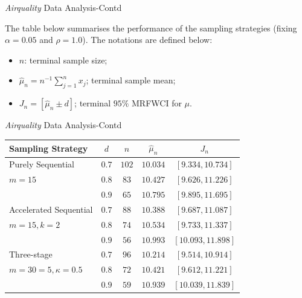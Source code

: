 \documentclass [xcolor=svgnames, t] {beamer}
\begin{document}
\begin{frame}{\textit{Airquality} Data Analysis-Contd}
  \vspace{5mm}

The table below summarises the performance of the sampling strategies (fixing $\alpha=0.05$ and $\rho=1.0$). The notations are defined below:
\begin{itemize}
\item $n$: terminal sample size;
\item $\hat{\mu}_n=n^{-1}\sum_{j=1}^n{x_j}$; terminal sample mean;
\item $J_n=[\hat{\mu}_n \pm d]$; terminal $95\%$ MRFWCI for $\mu$.
\end{itemize}

\end{frame}
\begin{frame}{\textit{Airquality} Data Analysis-Contd}

  \vspace{5mm}
    \begin{center}
\begin{tabular}{l c c c c} 
 \hline
 Sampling Strategy & $d$ & $n$ & $\hat{\mu}_n$ & $J_n$  \\  
 \hline
{Purely Sequential}  & $0.7$ & $102$ & $10.034$ & $[9.334,10.734]$  \\ 
 $m=15$ & $0.8$ & $83$ & $10.427$ & $[9.626,11.226]$ \\
  & $0.9$ & $65$ & $10.795$ & $[9.895,11.695]$\\
 \hline
 {Accelerated Sequential}  & $0.7$ & $88$ & $10.388$ & $[9.687,11.087]$  \\ 
 $m=15, k=2$ & $0.8$ & $74$ & $10.534$ & $[9.733,11.337]$ \\
  & $0.9$ & $56$ & $10.993$ & $[10.093,11.898]$\\
  \hline
{Three-stage }  & $0.7$ & $96$ &$10.214$ & $[9.514,10.914]$  \\ 
 $m=30=5,\kappa=0.5$ & $0.8$ & $72$ & $10.421$ & $[9.612,11.221]$ \\
  & $0.9$ & $59$ & $10.939$ & $[10.039,11.839]$\\
 \hline
\end{tabular}
\end{center}
\end{frame}
\end{document}
